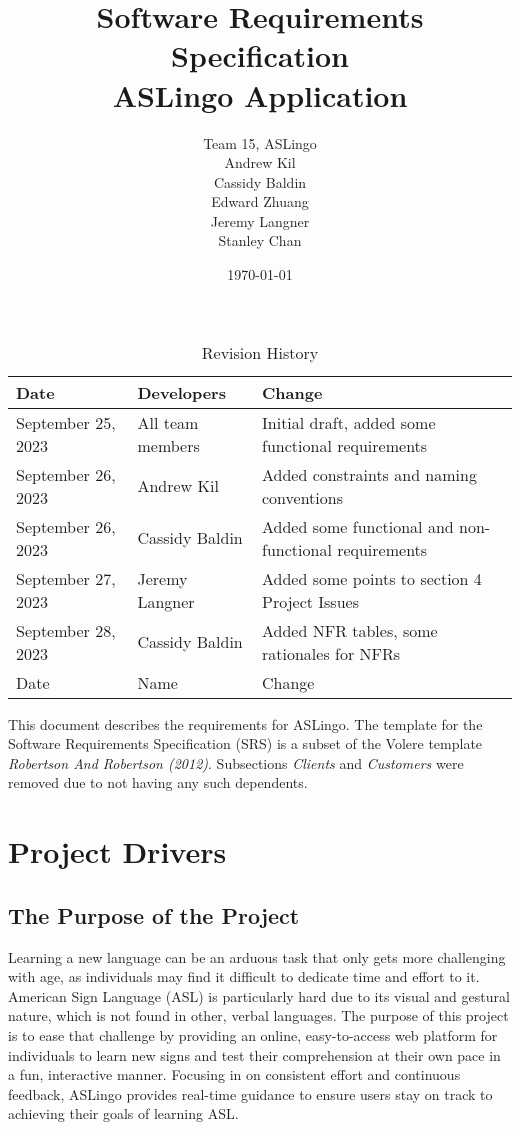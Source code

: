 \documentclass[12pt, titlepage]{article}
\title{Software Requirements Specification\\ASLingo Application}
\author{Team 15, ASLingo
		\\ Andrew Kil
		\\ Cassidy Baldin
		\\ Edward Zhuang
		\\ Jeremy Langner
		\\ Stanley Chan
}
\date{\today}
\begin{document}
\maketitle

\tableofcontents
\listoftables
\listoffigures

\begin{table}[H]
\caption{Revision History}
\begin{tabularx}{\textwidth}{|l|l|X|}
\toprule {\bf Date} & {\bf Developers} & {\bf Change}\\
\midrule
September 25, 2023 & All team members & Initial draft, added some functional requirements \\
September 26, 2023 & Andrew Kil & Added constraints and naming conventions \\
September 26, 2023 & Cassidy Baldin & Added some functional and non-functional requirements \\
September 27, 2023 & Jeremy Langner & Added some points to section 4 Project Issues \\
September 28, 2023 & Cassidy Baldin & Added NFR tables, some rationales for NFRs \\
Date & Name & Change\\
\bottomrule
\end{tabularx}
\end{table}

\newpage


This document describes the requirements for ASLingo. The template for the Software
Requirements Specification (SRS) is a subset of the Volere
template \textit{Robertson And Robertson (2012)}.  Subsections \textit{Clients} and \textit{Customers} were removed due to not having any such dependents.

\section{Project Drivers}

\subsection{The Purpose of the Project}

Learning a new language can be an arduous task that only gets more challenging
with age, as individuals may find it difficult to dedicate time and effort to
it. American Sign Language (ASL) is particularly hard due to its visual and
gestural nature, which is not found in other, verbal languages. The purpose of this project is
to ease that challenge by providing an online, easy-to-access web platform for
individuals to learn new signs and test their comprehension at their own pace
in a fun, interactive manner. Focusing in on consistent effort and continuous
feedback, ASLingo provides real-time guidance to ensure users stay on track to
achieving their goals of learning ASL.
\end{document}
